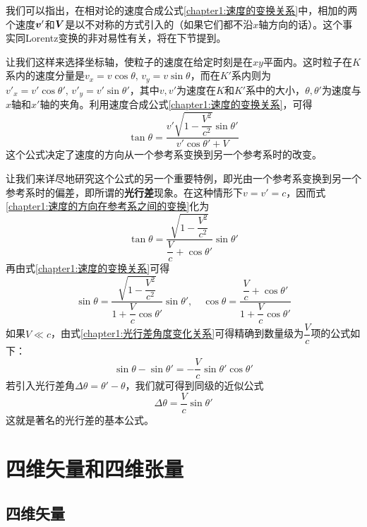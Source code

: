 我们可以指出，在相对论的速度合成公式\eqref{chapter1:速度的变换关系}中，相加的两个速度$\boldsymbol{v}'$和$\boldsymbol{V}$是以不对称的方式引入的（如果它们都不沿$x$轴方向的话）。这个事实同Lorentz变换的非对易性有关，将在下节提到。

让我们这样来选择坐标轴，使粒子的速度在给定时刻是在$xy$平面内。这时粒子在$K$系内的速度分量是$v_x=v\cos \theta,\,v_y=v\sin \theta$，而在$K'$系内则为$v'_x=v'\cos \theta',\,v'_y=v'\sin \theta'$，其中$v,v'$为速度在$K$和$K'$系中的大小，$\theta,\theta'$为速度与$x$轴和$x'$轴的夹角。利用速度合成公式\eqref{chapter1:速度的变换关系}，可得
\begin{equation}
	\tan \theta = \frac{v'\sqrt{1-\dfrac{V^2}{c^2}}\sin \theta'}{v'\cos \theta'+V}
	\label{chapter1:速度的方向在参考系之间的变换}
\end{equation}
这个公式决定了速度的方向从一个参考系变换到另一个参考系时的改变。

让我们来详尽地研究这个公式的另一个重要特例，即光由一个参考系变换到另一个参考系时的偏差，即所谓的{\bf 光行差}现象。在这种情形下$v=v'=c$，因而式\eqref{chapter1:速度的方向在参考系之间的变换}化为
\begin{equation}
	\tan \theta = \frac{\sqrt{1-\dfrac{V^2}{c^2}}}{\dfrac{V}{c}+\cos \theta'}\sin \theta'
\end{equation}
再由式\eqref{chapter1:速度的变换关系}可得
\begin{equation}
	\sin \theta = \frac{\sqrt{1-\dfrac{V^2}{c^2}}}{1+\dfrac{V}{c}\cos \theta'}\sin \theta',\quad \cos \theta = \frac{\dfrac{V}{c}+\cos \theta'}{1+\dfrac{V}{c}\cos \theta'}
	\label{chapter1:光行差角度变化关系}
\end{equation}
如果$V \ll c$，由式\eqref{chapter1:光行差角度变化关系}可得精确到数量级为$\dfrac{V}{c}$项的公式如下：
\begin{equation*}
	\sin \theta - \sin \theta' = -\frac{V}{c}\sin \theta'\cos \theta'
\end{equation*}
若引入光行差角$\Delta \theta = \theta'-\theta$，我们就可得到同级的近似公式
\begin{equation}
	\Delta \theta = \frac{V}{c} \sin \theta'
\end{equation}
这就是著名的光行差的基本公式。

\section{四维矢量和四维张量}

\subsection{四维矢量}

